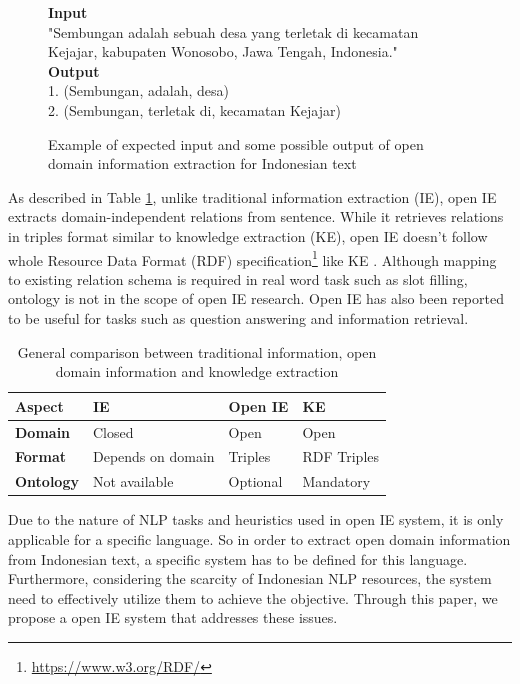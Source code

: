 \documentclass[peerreview,12pt]{IEEEtran}
\begin{document}
\begin{figure}
\begin{mdframed}
\textbf{Input} \\[0.1cm]
"Sembungan adalah sebuah desa yang terletak di kecamatan Kejajar, kabupaten Wonosobo, Jawa Tengah, Indonesia." \\[0.5cm]
\textbf{Output} \\[0.1cm]
1. (Sembungan, adalah, desa) \\
2. (Sembungan, terletak di, kecamatan Kejajar)
\end{mdframed}
\caption{Example of expected input and some possible output of open domain information extraction for Indonesian text}
\label{fig_example_io_openie}
\end{figure}

As described in Table \ref{table_paradigm_comparison}, unlike traditional information extraction (IE), open IE extracts domain-independent relations from sentence. While it retrieves relations in triples format similar to knowledge extraction (KE), open IE doesn't follow whole Resource Data Format (RDF) specification\footnote{\url{https://www.w3.org/RDF/}} like KE\cite{auer2007dbpedia} \cite{exner2014refractive}. Although mapping to existing relation schema is required in real word task such as slot filling\cite{angeli2015leveraging}, ontology is not in the scope of open IE research. Open IE has also been reported to be useful for tasks such as question answering\cite{fader2011identifying} and information retrieval\cite{etzioni2011search}. 

\begin{table}
\renewcommand{\arraystretch}{1.5}
\caption{General comparison between traditional information, open domain information and knowledge extraction}
\label{table_paradigm_comparison}
\centering
\begin{tabular}{l >{\centering\arraybackslash}p{1.9cm} >{\centering\arraybackslash}p{1.9cm} >{\centering\arraybackslash}p{1.9cm}}
\hline 
\textbf{Aspect} & \textbf{IE} & \textbf{Open IE} & \textbf{KE} \\ 
\hline 
\textbf{Domain} & Closed & Open & Open \\ 
\textbf{Format} & Depends on domain & Triples & RDF Triples \\ 
\textbf{Ontology} & Not available & Optional & Mandatory \\ 
\hline 
\end{tabular} 
\end{table}

Due to the nature of NLP tasks and heuristics used in open IE system, it is only applicable for a specific language\cite{banko2007open}. So in order to extract open domain information from Indonesian text, a specific system has to be defined for this language. Furthermore, considering the scarcity of Indonesian NLP resources, the system need to effectively utilize them to achieve the objective. Through this paper, we propose a open IE system that addresses these issues.
\end{document}

